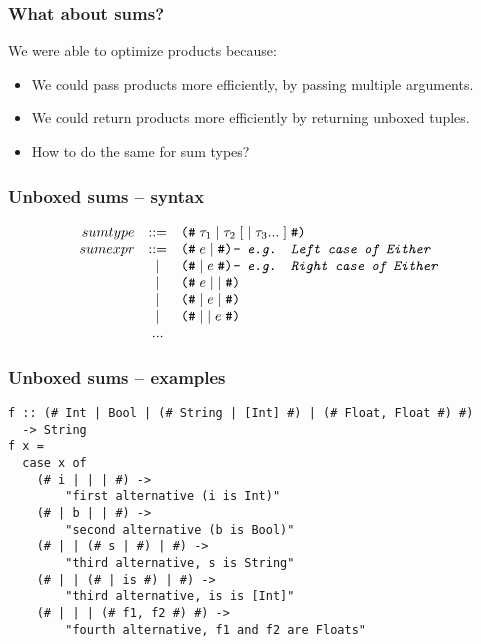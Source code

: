 \documentclass{beamer}
\begin{document}
\begin{frame}
    \frametitle{What about sums?}

    We were able to optimize products because:

    \begin{itemize}
        \item We could pass products more efficiently, by passing multiple
            arguments.

        \item We could return products more efficiently by returning unboxed
            tuples.

        \item How to do the same for sum types?
    \end{itemize}
\end{frame}

\begin{frame}
    \frametitle{Unboxed sums -- syntax}

    \[
        \begin{array}{rcll}
            sum type & ::= & \texttt{(\#} \; \tau_1 \; | \; \tau_2 \; [ \; | \; \tau_3 ... \; ] \; \texttt{\#)} \\
            sum expr & ::= & \texttt{(\#} \; e \; | \; \texttt{\#)} \texttt{\textit{-- e.g. Left case of Either}} \\
                     &  |  & \texttt{(\#} \; | \; e \; \texttt{\#)} \texttt{\textit{-- e.g. Right case of Either}} \\
                     &  |  & \texttt{(\#} \; e \; | \; | \; \texttt{\#)} \\
                     &  |  & \texttt{(\#} \; | \; e \; | \; \texttt{\#)} \\
                     &  |  & \texttt{(\#} \; | \; | \; e \; \texttt{\#)} \\
                     & ... & \\
        \end{array}
    \]
\end{frame}

\begin{frame}[fragile]
    \frametitle{Unboxed sums -- examples}

    \begin{verbatim}
f :: (# Int | Bool | (# String | [Int] #) | (# Float, Float #) #)
  -> String
f x =
  case x of
    (# i | | | #) ->
        "first alternative (i is Int)"
    (# | b | | #) ->
        "second alternative (b is Bool)"
    (# | | (# s | #) | #) ->
        "third alternative, s is String"
    (# | | (# | is #) | #) ->
        "third alternative, is is [Int]"
    (# | | | (# f1, f2 #) #) ->
        "fourth alternative, f1 and f2 are Floats"
    \end{verbatim}
\end{frame}
\end{document}
